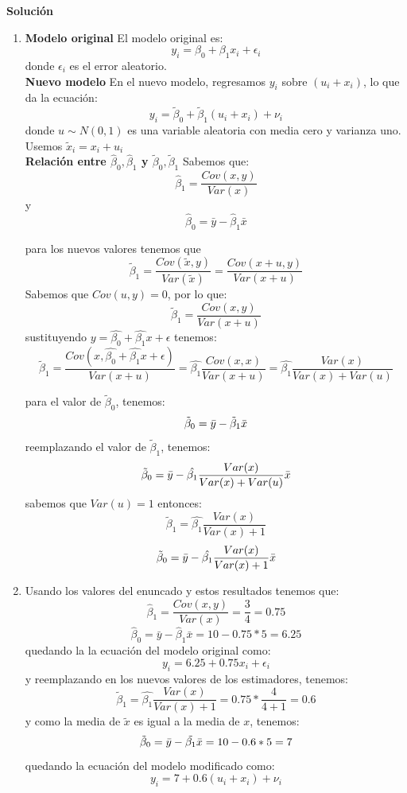 \documentclass[10pt,a4paper]{article}
\begin{document}
\textbf{Solución}
\begin{enumerate}
    \item \textbf{Modelo original}
El modelo original es:
\[
y_i = \beta_0 + \beta_1 x_i + \epsilon_i
\]
donde \( \epsilon_i \) es el error aleatorio. \\

\textbf{Nuevo modelo}
En el nuevo modelo, regresamos \( y_i \) sobre \( (u_i + x_i) \), lo que da la ecuación:
\[
y_i = \tilde{\beta}_0 + \tilde{\beta}_1 (u_i + x_i) + \nu_i
\]
donde \( u \sim N(0, 1) \) es una variable aleatoria con media cero y varianza uno. Usemos  $\tilde{x}_i = x_i + u_i$ \\

\textbf{Relación entre \( \hat{\beta}_0, \hat{\beta}_1 \) y \( \tilde{\beta}_0, \tilde{\beta}_1 \)}
Sabemos que:
\[
\hat{\beta}_1 = \frac{Cov(x,y)}{Var(x)} 
\]
y
\[
\hat{\beta}_0 = \bar{y} - \hat{\beta}_1 \bar{x} 
\]

para los nuevos valores tenemos que 
$$\tilde{\beta}_1 = \frac{Cov(\tilde{x},y)}{Var(\tilde{x})} = \frac{Cov(x+u,y)}{Var(x+u)}$$
Sabemos que $Cov(u,y)=0$, por lo que:
$$\tilde{\beta}_1 = \frac{Cov(x,y)}{Var(x+u)}$$
sustituyendo $y = \hat{\beta_0} + \hat{\beta_1}x +\epsilon $ tenemos:
$$\tilde{\beta}_1 = \frac{Cov(x,\hat{\beta_0} + \hat{\beta_1}x +\epsilon)}{Var(x+u)} = \hat{\beta_1} \frac{Cov(x,x)}{Var(x+u)} = \hat{\beta_1}\frac{Var(x)}{Var(x)+Var(u)}$$

para el valor de $\tilde{\beta}_0$, tenemos:
$$\tilde{\beta}_0 = \Bar{y} - \tilde{\beta}_1 \Bar{x}$$
reemplazando el valor de $\tilde{\beta}_1$, tenemos:
$$\tilde{\beta}_0 = \Bar{y} - \hat{\beta_1}\frac{Var(x)}{Var(x)+Var(u)} \Bar{x}$$
sabemos que $Var(u)=1$ entonces:
$$\tilde{\beta}_1 =  \hat{\beta_1}\frac{Var(x)}{Var(x)+1}$$
$$\tilde{\beta}_0 = \Bar{y} - \hat{\beta_1}\frac{Var(x)}{Var(x)+1} \Bar{x}$$

\item Usando los valores del enuncado y estos resultados tenemos que:
$$\hat{\beta}_1 = \frac{Cov(x,y)}{Var(x)}  = \frac{3}{4} = 0.75$$
$$\hat{\beta}_0 = \bar{y} - \hat{\beta}_1 \bar{x} = 10-0.75*5 = 6.25 $$
quedando la la ecuación del modelo original como:
$$y_i = 6.25 + 0.75 x_i + \epsilon_i$$
y reemplazando en los nuevos valores de los estimadores, tenemos:
$$\tilde{\beta}_1 =  \hat{\beta_1}\frac{Var(x)}{Var(x)+1} = 0.75*\frac{4}{4+1}=0.6$$
y como la media de $\tilde{x}$ es igual a la media de $x$, tenemos:
$$\tilde{\beta}_0 = \Bar{y} - \tilde{\beta_1} \Bar{x} = 10-0.6*5= 7$$
quedando la ecuación del modelo modificado como:
$$y_i = 7 + 0.6 (u_i + x_i) + \nu_i$$

\end{enumerate}
\end{document}
